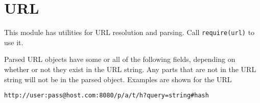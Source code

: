 \section{URL}\label{url}

\begin{Shaded}
\begin{Highlighting}[]
 
\end{Highlighting}
\end{Shaded}

This module has utilities for URL resolution and parsing. Call
\texttt{require(\textquotesingle{}url\textquotesingle{})} to use it.

Parsed URL objects have some or all of the following fields, depending
on whether or not they exist in the URL string. Any parts that are not
in the URL string will not be in the parsed object. Examples are shown
for the URL

\texttt{\textquotesingle{}http://user:pass@host.com:8080/p/a/t/h?query=string\#hash\textquotesingle{}}

